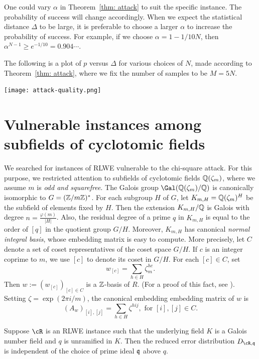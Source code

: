\documentclass{amsart}
\begin{document}
\begin{remark}
One could vary $\alpha$ in Theorem~\ref{thm: attack} to suit the specific instance.
The probability of success will change accordingly. When we expect the statistical distance $\Delta$ to be large, it is preferable to choose a larger $\alpha$ to increase the probability of success.  For example, if we choose $\alpha = 1-1/10N$, then $\alpha^{N-1} \geq e^{-1/10} = 0.904 \cdots$. 
\end{remark}

The following is a plot of $p$ versus $\Delta$ for various choices of $N$, made according to Theorem~\ref{thm: attack}, where we fix the number of samples to be $M = 5N$.

\begin{center}
\texttt{[image: attack-quality.png]}
\end{center}

\section{Vulnerable instances among subfields of cyclotomic fields}\label{sec: sub-cyclotomics}

We searched for instances of RLWE vulnerable to the chi-square attack.  For this purpose, we restricted attention to subfields of cyclotomic fields $\mathbb{Q}(\zeta_m)$, where we assume $m$ is {\it odd and squarefree}. The Galois group $\Gal(\bQ(\zeta_m)/\bQ)$ is canonically isomorphic to $G = (\mathbb{Z}/m\mathbb{Z})^*$. For each subgroup $H$ of $G$, let $K_{m,H} = \mathbb{Q}(\zeta_m)^H$ be the subfield of elements fixed by $H$.
Then the extension $K_{m,H}/\mathbb{Q}$ is Galois with degree $n = \frac{\varphi(m)}{|H|}$. Also, the residual degree of a prime $q$ in $K_{m,H}$ is equal to the order of $[q]$ in the quotient group $G/H$. Moreover, $K_{m,H}$ has canonical {\it normal integral basis}, whose embedding matrix is easy to compute. More precisely, let $C$ denote a set of coset representatives of the coset space $G/H$. If $c$ is an integer coprime to $m$, we use $[c]$ to denote its coset in $G/H$. For each $[c] \in C$, set
\[
    w_{[c]} =  \sum_{h \in H} \zeta_m^{hc}.
\]
Then  $w := (w_{[c]})_{[c] \in C}$ is a $\mathbb{Z}$-basis of $R$. (For a proof of this fact, see \cite[Proposition 6.1]{johnston2011notes}). Setting $\zeta = \exp(2\pi i /m)$, the canonical embedding embedding matrix of $w$ is
\[
    (A_w)_{[i],[j]} = \sum_{h \in H}{\zeta^{hij}}, \mbox{ for } [i], [j] \in C.
\]

\begin{Lemma} \label{lem: symmetry}
Suppose $\cR$ is an RLWE instance such that the underlying field $K$ is a Galois number field and $q$ is unramified in $K$. Then the reduced error distribution $D_{\cR,\fq}$ is independent of the choice of prime ideal $\mathfrak{q}$ above $q$.
\end{Lemma}
\end{document}
